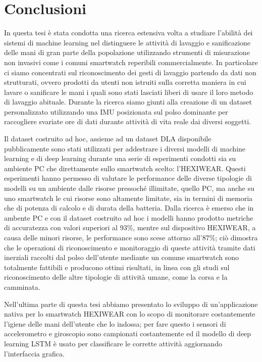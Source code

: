 \chapter{Conclusioni}
\label{cap:conclusioni}

In questa tesi è stata condotta una ricerca estensiva volta a studiare l'abilità dei sistemi di machine learning nel distinguere le attività di lavaggio e sanificazione delle mani di gran parte della popolazione utilizzando strumenti di misurazione non invasivi come i comuni smartwatch reperibili commercialmente. In particolare ci siamo concentrati sul riconoscimento dei gesti di lavaggio partendo da dati non strutturati, ovvero prodotti da utenti non istruiti sulla corretta maniera in cui lavare o sanificare le mani i quali sono stati lasciati liberi di usare il loro metodo di lavaggio abituale. Durante la ricerca siamo giunti alla creazione di un dataset personalizzato utilizzando una IMU posizionata sul polso dominante per raccogliere svariate ore di dati durante attività di vita reale dai diversi soggetti.

Il dataset costruito ad hoc, assieme ad un dataset DLA disponibile pubblicamente sono stati utilizzati per addestrare i diversi modelli di machine learning e di deep learning durante una serie di esperimenti condotti sia su ambiente PC che direttamente sullo smartwatch scelto: l'HEXIWEAR. Questi esperimenti hanno permesso di valutare le performance delle diverse tipologie di modelli su un ambiente dalle risorse pressoché illimitate, quello PC, ma anche su uno smartwatch le cui risorse sono altamente limitate, sia in termini di memoria che di potenza di calcolo e di durata della batteria. Dalla ricerca è emerso che in ambente PC e con il dataset costruito ad hoc i modelli hanno prodotto metriche di accuratezza con valori superiori al 93\%, mentre sul dispositivo HEXIWEAR, a causa delle minori risorse, le performance sono scese attorno all'87\%; ciò dimostra che le operazioni di riconoscimento e monitoraggio di queste attività tramite dati inerziali raccolti dal polso dell'utente mediante un comune smartwatch sono totalmente fattibili e producono ottimi risultati, in linea con gli studi sul riconoscimento delle altre tipologie di attività umane, come la corsa e la camminata.

Nell'ultima parte di questa tesi abbiamo presentato lo sviluppo di un'applicazione nativa per lo smartwatch HEXIWEAR con lo scopo di monitorare costantemente l'igiene delle mani dell'utente che lo indossa; per fare questo i sensori di accelerometro e giroscopio sono campionati costantemente ed il modello di deep learning LSTM è usato per classificare le corrette attività aggiornando l'interfaccia grafica.

